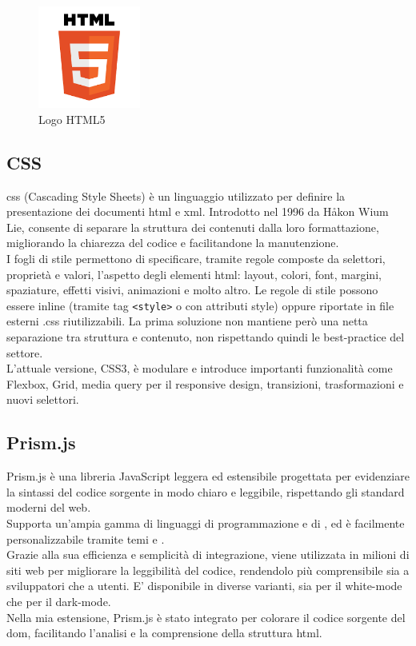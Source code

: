 \begin{figure}[H]
    \centering
    \includegraphics[width=0.3\textwidth]{img/html5.png}
    \caption[Logo HTML5]{Logo HTML5}
\end{figure}

\subsection{CSS}
\noindent \acrshort{css} (Cascading Style Sheets) è un linguaggio utilizzato per definire la presentazione dei documenti \acrshort{html} e \acrshort{xml}. Introdotto nel 1996 da Håkon Wium Lie, consente di separare la struttura dei contenuti dalla loro formattazione, migliorando la chiarezza del codice e facilitandone la manutenzione.\\ 
I fogli di stile permettono di specificare, tramite regole composte da selettori, proprietà e valori, l’aspetto degli elementi \acrshort{html}: layout, colori, font, margini, spaziature, effetti visivi, animazioni e molto altro. Le regole di stile possono essere inline (tramite tag \texttt{<style>} o con attributi style) oppure riportate in file esterni .css riutilizzabili. La prima soluzione non mantiene però una netta separazione tra struttura e contenuto, non rispettando quindi le best-practice del settore.\\ 
L'attuale versione, CSS3, è modulare e introduce importanti funzionalità come Flexbox, Grid, media query per il responsive design, transizioni, trasformazioni e nuovi selettori.

\subsection{Prism.js}
\noindent Prism.js è una libreria JavaScript leggera ed estensibile progettata per evidenziare la sintassi del codice sorgente in modo chiaro e leggibile, rispettando gli standard moderni del web. \\
Supporta un’ampia gamma di linguaggi di programmazione e di , ed è facilmente personalizzabile tramite temi e . \\
Grazie alla sua efficienza e semplicità di integrazione, viene utilizzata in milioni di siti web per migliorare la leggibilità del codice, rendendolo più comprensibile sia a sviluppatori che a utenti. E’ disponibile in diverse varianti, sia per il white-mode che per il dark-mode.\\
Nella mia estensione, Prism.js è stato integrato per colorare il codice sorgente del \acrshort{dom}, facilitando l’analisi e la comprensione della struttura \acrshort{html}.

